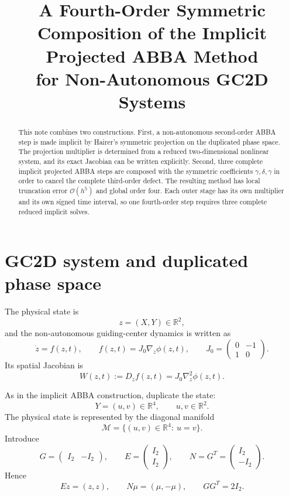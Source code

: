 \documentclass[11pt,a4paper]{article}
\title{\textbf{A Fourth-Order Symmetric Composition of the Implicit Projected ABBA Method\\for Non-Autonomous GC2D Systems}}
\author{}
\date{}
\newcommand{\OO}{\mathcal{O}}
\newcommand{\RR}{\mathbb{R}}
\newcommand{\Id}{I_2}
\begin{document}
\maketitle

\begin{abstract}
This note combines two constructions. First, a non-autonomous second-order ABBA step is made implicit by Hairer's symmetric projection on the duplicated phase space. The projection multiplier is determined from a reduced two-dimensional nonlinear system, and its exact Jacobian can be written explicitly. Second, three complete implicit projected ABBA steps are composed with the symmetric coefficients $\gamma,\delta,\gamma$ in order to cancel the complete third-order defect. The resulting method has local truncation error $\OO(h^5)$ and global order four. Each outer stage has its own multiplier and its own signed time interval, so one fourth-order step requires three complete reduced implicit solves.
\end{abstract}

\section{GC2D system and duplicated phase space}
The physical state is
\begin{equation}
    z=(X,Y)\in\RR^2,
\end{equation}
and the non-autonomous guiding-center dynamics is written as
\begin{equation}
    \dot z=f(z,t),
    \qquad
    f(z,t)=J_0\nabla_z\phi(z,t),
    \qquad
    J_0=\begin{pmatrix}0&-1\\1&0\end{pmatrix}.
\end{equation}
Its spatial Jacobian is
\begin{equation}
    W(z,t):=D_zf(z,t)=J_0\nabla_z^2\phi(z,t).
\end{equation}

As in the implicit ABBA construction, duplicate the state:
\begin{equation}
    Y=(u,v)\in\RR^4,
    \qquad u,v\in\RR^2.
\end{equation}
The physical state is represented by the diagonal manifold
\begin{equation}
    \mathcal M=\{(u,v)\in\RR^4:\ u=v\}.
\end{equation}
Introduce
\begin{equation}
    G=\begin{pmatrix}\Id&-\Id\end{pmatrix},
    \qquad
    E=\begin{pmatrix}\Id\\\Id\end{pmatrix},
    \qquad
    N=G^T=\begin{pmatrix}\Id\\-\Id\end{pmatrix}.
\end{equation}
Hence
\begin{equation}
    Ez=(z,z),
    \qquad
    N\mu=(\mu,-\mu),
    \qquad
    GG^T=2\Id.
\end{equation}
\end{document}
